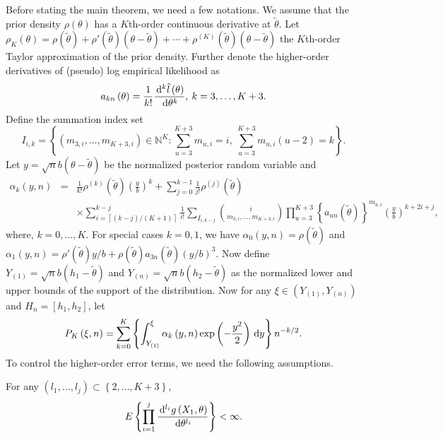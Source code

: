 Before stating the main theorem, we need a few notations. We assume that the
prior density $\rho\left(\theta\right)$ has a $K$th-order continuous derivative
at $\tilde{\theta}$. Let $\rho_{K}\left(\theta\right)=\rho\left(\tilde{\theta}\right)+\rho'\left(\tilde{\theta}\right)\left(\theta-\tilde{\theta}\right)+\cdots+\rho^{\left(K\right)}\left(\tilde{\theta}\right)\left(\theta-\tilde{\theta}\right)$ the $K$th-order  Taylor approximation of the prior density.
Further denote the higher-order derivatives of (pseudo) log empirical
likelihood as 
\[
a_{kn}\left(\theta\right)=\frac{1}{k!}\frac{\,\mathrm{d}^{k}\tilde{l}\left(\theta\right)}{\,\mathrm{d}\theta^{k}},\: k=3,\ldots,K+3.
\]
 Define the summation index set 
\[
I_{i,k}=\left\{ \left(m_{3,i},\ldots,m_{K+3,i}\right)\in\mathbb{N}^{K}:\sum_{u=3}^{K+3}m_{u,i}=i,\:\sum_{u=3}^{K+3}m_{u,i}\left(u-2\right)=k\right\} .
\]
 Let $y=\sqrt{n}b\left(\theta-\tilde{\theta}\right)$ be the normalized posterior random variable and 
\begin{eqnarray*}
\alpha_{k}\left(y,n\right) & = & \frac{1}{k!}\rho^{\left(k\right)}\left(\tilde{\theta}\right)\left(\frac{y}{b}\right)^{k}+\sum_{j=0}^{k-1}\frac{1}{j!}\rho^{\left(j\right)}\left(\tilde{\theta}\right)\\
 &  & \times\sum_{i=\left\lceil \left(k-j\right)/\left(K+1\right)\right\rceil }^{k-j}\frac{1}{i!}\sum_{I_{i,k-j}}\binom{i}{m_{3,i},\ldots,m_{K+3,i}}\prod_{u=3}^{K+3}\left\{ a_{un}\left(\tilde{\theta}\right)\right\} ^{m_{u,i}}\left(\frac{y}{b}\right)^{k+2i+j},
\end{eqnarray*}
where, $k=0,\ldots,K$. For special cases $k=0,1$, we have $\alpha_{0}\left(y,n\right)=\rho\left(\tilde{\theta}\right)$
and $\alpha_{1}\left(y,n\right)=\rho'\left(\tilde{\theta}\right)y/b+\rho\left(\tilde{\theta}\right)a_{3n}\left(\tilde{\theta}\right)\left(y/b\right)^{3}.$
Now define $Y_{\left(1\right)}=\sqrt{n}b\left(h_{1}-\tilde{\theta}\right)$
and $Y_{\left(n\right)}=\sqrt{n}b\left(h_{2}-\tilde{\theta}\right)$  as  the normalized lower and upper bounds of the support of the  distribution. Now for any $\xi\in\left(Y_{\left(1\right)},Y_{\left(n\right)}\right)$ 
and $H_n=\left[h_{1},h_{2}\right]$, {let }
\[
P_{K}\left(\xi,n\right)=\sum_{k=0}^{K}\left\{ \int_{Y_{\left(1\right)}}^{\xi}\alpha_{k}\left(y,n\right)\exp\left(-\frac{y^{2}}{2}\right)\,\mathrm{d} y\right\} n^{-k/2}.
\]
To control the higher-order error terms, we need the following assumptions.
\begin{assumption}
\label{ass:higher-order-moment-deriv-g}
For any $\left(l_1,\ldots,l_j\right)\subset\left\{2,\ldots,K+3\right\}$,
\[
	E\left\{\prod_{i=1}^j \frac{\,\mathrm{d}^{l_i} g\left(X_1,\theta\right)}{\,\mathrm{d} \theta^{l_i}}\right\} < \infty.
\]
\end{assumption}
